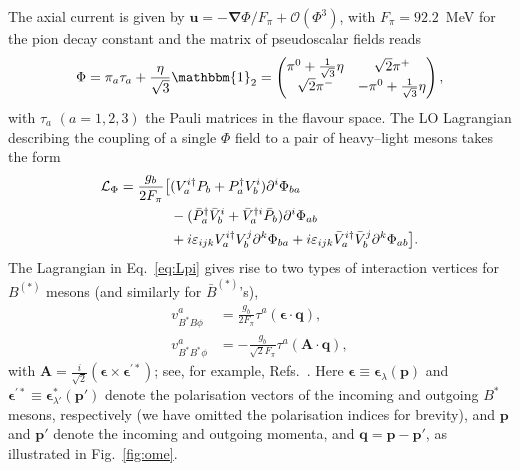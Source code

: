 \documentclass[aps,prd,showpacs,amsmath,twocolumn,superscriptaddress,floatfix,nofootinbib,notitlepage]{revtex4-2}
\newcommand{\vep}{{\bm p}}
\newcommand{\veq}{{\bm q}}
\newcommand{\veA}{{\bm A}}
\newcommand{\be}{\begin{equation}}
\newcommand{\ee}{\end{equation}}
\renewcommand{\vec}{\bm}
\newcommand{\veep}{{\bm \epsilon}}
\begin{document}
The axial current is given by $\vec{u}=-\vec{\nabla}\Phi/F_\pi+\mathcal{O}(\Phi^3)$, with $F_\pi=92.2$~MeV for the pion decay constant and the matrix of pseudoscalar fields reads
\be
\Phi=\pi_a\tau_a+\frac{\eta}{\sqrt{3}}\mathbbm{1}_2
=\begin{pmatrix}
\pi^0+\frac{1}{\sqrt{3}}\eta & \sqrt{2}\pi^+\\
\sqrt{2}\pi^- & -\pi^0+\frac{1}{\sqrt{3}}\eta
\end{pmatrix},
\label{eq:u-phi-def}
\ee
with $\tau_a$ $(a=1,2,3)$ the Pauli matrices in the flavour space.
The LO Lagrangian describing the coupling of a single $\Phi$ field to a pair of heavy--light mesons takes the form 
\begin{align}
\mathcal{L}_{\Phi}=\frac{g_b}{2F_\pi}\big[&
(V_a^{i\dagger}P_b+P_a^{\dagger}V_b^{i})\partial^{i}\Phi_{ba}\notag\\
&-(\bar{P}_a^{\dagger}\bar{V}_b^{i}+\bar{V}_a^{\dagger i}\bar{P}_b)
\partial^{i}\Phi_{ab} \label{eq:Lpi}\\
&+ i\varepsilon_{ijk}V_a^{i\dagger}V_b^j\partial^k\Phi_{ba}
+i\varepsilon_{ijk}\bar V_a^{i\dagger}\bar V_b^j\partial^k\Phi_{ab}\big].\notag
\end{align}
The Lagrangian in Eq.~\eqref{eq:Lpi} gives rise to two types of interaction vertices for $B^{(*)}$ mesons (and similarly for $\bar{B}^{(*)}$'s),
\begin{align}
v^a_{B^*B\phi}&=\frac{g_b}{2 F_\pi}\tau^a(\veep\cdot\veq),
\label{vBBst}\\
v^a_{B^*B^*\phi}&=-\frac{g_b}{\sqrt2 F_\pi}\tau^a(\veA \cdot\veq),
\label{vBstBst}
\end{align}
with $\veA=\frac{i}{\sqrt{2}}(\veep\times \veep^{\prime*})$; see, for example, Refs.~\cite{Nieves:2011zz,Baru:2016iwj}. Here $\veep\equiv\veep_{\lambda}(\vep)$ and $\veep^{\prime*}\equiv \veep_{\lambda'}^*(\vep')$ denote the polarisation vectors of the incoming and outgoing $B^*$ mesons, respectively (we have omitted the polarisation indices for brevity), and $\vep$ and $\vep'$ denote the incoming and outgoing momenta, and $\veq=\vep-\vep'$, as illustrated in Fig.~\ref{fig:ome}. 
\end{document}
